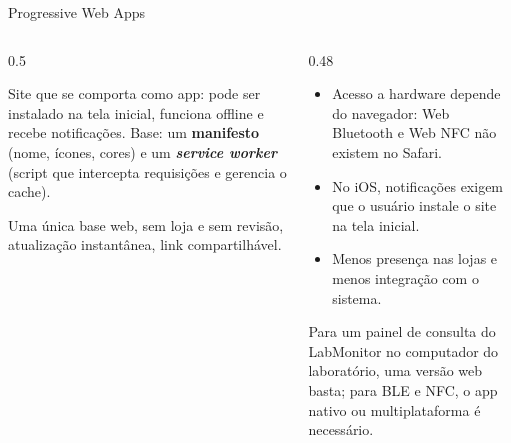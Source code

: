 \begin{frame}{Progressive Web Apps}
  \begin{columns}[T]
    \begin{column}{0.5\textwidth}
      \begin{definicao}[PWA]
        Site que se comporta como app: pode ser instalado na tela inicial, funciona offline e recebe notificações. Base: um \textbf{manifesto} (nome, ícones, cores) e um \textbf{\emph{service worker}} (script que intercepta requisições e gerencia o cache).
      \end{definicao}
      \begin{conceito}[Vantagens]
        Uma única base web, sem loja e sem revisão, atualização instantânea, link compartilhável.
      \end{conceito}
    \end{column}
    \begin{column}{0.48\textwidth}
      \begin{atencao}[Limites]
        \begin{itemize}
          \item Acesso a hardware depende do navegador: Web Bluetooth e Web NFC não existem no Safari.
          \item No iOS, notificações exigem que o usuário instale o site na tela inicial.
          \item Menos presença nas lojas e menos integração com o sistema.
        \end{itemize}
      \end{atencao}
      \begin{dica}
        Para um painel de consulta do LabMonitor no computador do laboratório, uma versão web basta; para BLE e NFC, o app nativo ou multiplataforma é necessário.
      \end{dica}
    \end{column}
  \end{columns}
\end{frame}

